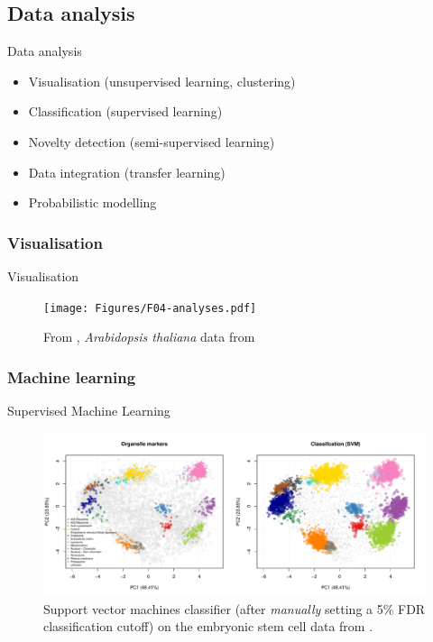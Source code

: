 \subsection*{Data analysis}
\label{sec:comp}


\begin{frame}{Data analysis}
  \begin{itemize}
  \item Visualisation (unsupervised learning, clustering) \citep{Gatto:2018}
  \item Classification (supervised learning) \citep{Breckels:2016b}
  \item Novelty detection (semi-supervised learning) \cite{Breckels:2013}
  \item Data integration (transfer learning) \citep{Breckels:2016}
  \item Probabilistic modelling \citep{Crook:2018}
  \end{itemize}
\end{frame}



\subsubsection*{Visualisation}
\label{sec:viz}

\begin{frame}{Visualisation}
  \begin{figure}
    \centering
    \texttt{[image: Figures/F04-analyses.pdf]}
    \caption{From \cite{Gatto:2010}, \textit{Arabidopsis thaliana} data
      from \cite{Dunkley:2006}}
  \end{figure}
\end{frame}

\subsubsection*{Machine learning}
\label{sec:ml}


\begin{frame}{Supervised Machine Learning}
  \begin{figure}[h]
    \centering
    \includegraphics[width=\linewidth]{figs_local/hyperlopit-class.pdf}
    \caption{Support vector machines classifier (after
      \textit{manually} setting a 5\% FDR classification cutoff) on
      the embryonic stem cell data from \cite{Christoforou:2016}.}
  \end{figure}
\end{frame}


